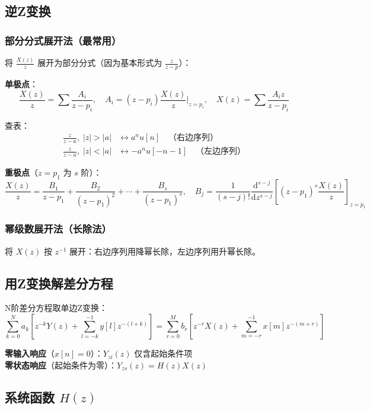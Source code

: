 \documentclass[11pt,a4paper]{ctexart}
\newcommand{\dd}{\mathrm{d}}            %
\begin{document}
\subsection{逆Z变换}

\subsubsection{部分分式展开法（最常用）}

将 $\frac{X(z)}{z}$ 展开为部分分式（因为基本形式为 $\frac{z}{z-p}$）：

\textbf{单极点}：
\[
\frac{X(z)}{z} = \sum \frac{A_i}{z - p_i},\quad A_i = (z-p_i)\frac{X(z)}{z}\bigg|_{z=p_i},\quad X(z) = \sum \frac{A_i z}{z - p_i}
\]

查表：
\begin{align*}
\frac{z}{z-a},\;|z|>|a| &\leftrightarrow a^n u[n] \quad\text{（右边序列）}\\
\frac{z}{z-a},\;|z|<|a| &\leftrightarrow -a^n u[-n-1] \quad\text{（左边序列）}
\end{align*}

\textbf{重极点}（$z = p_1$ 为 $s$ 阶）：
\[
\frac{X(z)}{z} = \frac{B_1}{z-p_1} + \frac{B_2}{(z-p_1)^2} + \cdots + \frac{B_s}{(z-p_1)^s},\quad
B_j = \frac{1}{(s-j)!}\frac{\dd^{s-j}}{\dd z^{s-j}}\left[(z-p_1)^s\frac{X(z)}{z}\right]_{z=p_1}
\]

\subsubsection{幂级数展开法（长除法）}
将 $X(z)$ 按 $z^{-1}$ 展开：右边序列用降幂长除，左边序列用升幂长除。

\subsection{用Z变换解差分方程}

N阶差分方程取单边Z变换：
\[
\sum_{k=0}^{N} a_k \left[z^{-k}Y(z) + \sum_{l=-k}^{-1} y[l]z^{-(l+k)}\right]
= \sum_{r=0}^{M} b_r \left[z^{-r}X(z) + \sum_{m=-r}^{-1} x[m]z^{-(m+r)}\right]
\]

\textbf{零输入响应}（$x[n] = 0$）：$Y_{zi}(z)$ 仅含起始条件项\\
\textbf{零状态响应}（起始条件为零）：$Y_{zs}(z) = H(z)X(z)$

\subsection{系统函数 $H(z)$}
\end{document}
